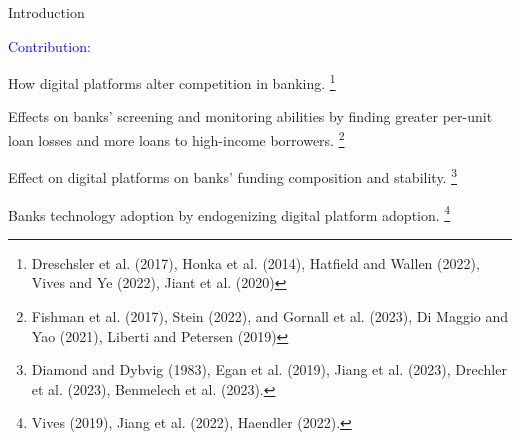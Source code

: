 \documentclass[notes,10pt, aspectratio=169]{beamer}
\newenvironment{wideitemize}{\itemize\addtolength{\itemsep}{10pt}}{\enditemize}
\begin{document}
\begin{frame}{Introduction}

    \begin{wideitemize}
        
        \item \textcolor{blue}{Contribution:} 
                \vspace{0.2cm}
        \begin{wideitemize}
            \item How digital platforms alter competition in banking. \footnote{Dreschsler et al. (2017), Honka et al. (2014), Hatfield and Wallen (2022), Vives and Ye (2022), Jiant et al. (2020)}
    
            \item Effects on banks' screening and monitoring abilities by finding greater per-unit loan losses and more loans to high-income borrowers.
            \footnote{Fishman et al. (2017), Stein (2022), and Gornall et al. (2023), Di Maggio and Yao (2021), Liberti and Petersen (2019)}
            
            \item Effect on digital platforms on banks' funding composition and stability. \footnote{Diamond and Dybvig (1983), Egan et al. (2019), Jiang et al. (2023), Drechler et al. (2023), Benmelech et al. (2023).}
        
            \item Banks technology adoption by endogenizing digital platform adoption. \footnote{Vives (2019), Jiang et al. (2022), Haendler (2022).}
            

        \end{wideitemize}
    \end{wideitemize}
    
\end{frame}
    
    
    
\end{document}
